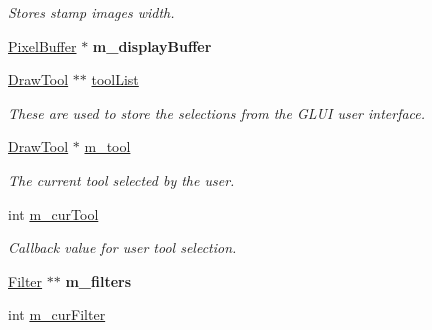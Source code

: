 \begin{DoxyCompactItemize}
\begin{DoxyCompactList}\small\item\em Stores stamp image\textquotesingle{}s width. \end{DoxyCompactList}\item 
\hyperlink{classPixelBuffer}{Pixel\+Buffer} $\ast$ {\bfseries m\+\_\+display\+Buffer}\hypertarget{classFlashPhotoApp_a9662e1dbd6e003a62179eecba827e910}{}\label{classFlashPhotoApp_a9662e1dbd6e003a62179eecba827e910}

\item 
\hyperlink{classDrawTool}{Draw\+Tool} $\ast$$\ast$ \hyperlink{classFlashPhotoApp_a752ba29ca132a3fd4deaa3727946f7f6}{tool\+List}\hypertarget{classFlashPhotoApp_a752ba29ca132a3fd4deaa3727946f7f6}{}\label{classFlashPhotoApp_a752ba29ca132a3fd4deaa3727946f7f6}

\begin{DoxyCompactList}\small\item\em These are used to store the selections from the G\+L\+UI user interface. \end{DoxyCompactList}\item 
\hyperlink{classDrawTool}{Draw\+Tool} $\ast$ \hyperlink{classFlashPhotoApp_a69d8dcf7147882964a6d2832bbab67e2}{m\+\_\+tool}\hypertarget{classFlashPhotoApp_a69d8dcf7147882964a6d2832bbab67e2}{}\label{classFlashPhotoApp_a69d8dcf7147882964a6d2832bbab67e2}

\begin{DoxyCompactList}\small\item\em The current tool selected by the user. \end{DoxyCompactList}\item 
int \hyperlink{classFlashPhotoApp_a4fe8a885ae7b5e698c40a7585b4e292d}{m\+\_\+cur\+Tool}\hypertarget{classFlashPhotoApp_a4fe8a885ae7b5e698c40a7585b4e292d}{}\label{classFlashPhotoApp_a4fe8a885ae7b5e698c40a7585b4e292d}

\begin{DoxyCompactList}\small\item\em Callback value for user tool selection. \end{DoxyCompactList}\item 
\hyperlink{classFilter}{Filter} $\ast$$\ast$ {\bfseries m\+\_\+filters}\hypertarget{classFlashPhotoApp_a40ef9e2d21c3f80cee59be363e21b9bc}{}\label{classFlashPhotoApp_a40ef9e2d21c3f80cee59be363e21b9bc}

\item 
int \hyperlink{classFlashPhotoApp_a584dd16d8f2aad51028759a1dd94c83f}{m\+\_\+cur\+Filter}\hypertarget{classFlashPhotoApp_a584dd16d8f2aad51028759a1dd94c83f}{}\label{classFlashPhotoApp_a584dd16d8f2aad51028759a1dd94c83f}


\end{DoxyCompactItemize}
